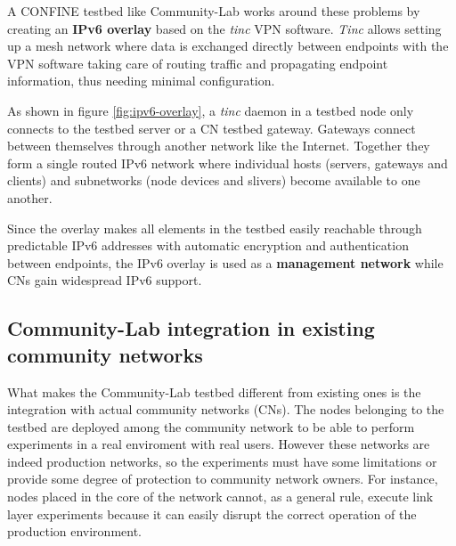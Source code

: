 \documentclass[conference]{IEEEtran}
\begin{document}
A CONFINE testbed like Community-Lab works around these problems by creating an \textbf{IPv6
  overlay} based on the \emph{tinc} \cite{tinc} VPN software.  \emph{Tinc}
allows setting up a mesh network where data is exchanged directly between
endpoints with the VPN software taking care of routing traffic and propagating
endpoint information, thus needing minimal configuration.

As shown in figure \ref{fig:ipv6-overlay}, a \emph{tinc} daemon in a testbed
node only connects to the testbed server or a CN testbed gateway.  Gateways
connect between themselves through another network like the Internet.
Together they form a single routed IPv6 network where individual hosts
(servers, gateways and clients) and subnetworks (node devices and slivers)
become available to one another.

Since the overlay makes all elements in the testbed easily reachable through
predictable IPv6 addresses with automatic encryption and authentication
between endpoints, the IPv6 overlay is used as a \textbf{management network}
while CNs gain widespread IPv6 support.






\subsection{Community-Lab integration in existing community networks}

What makes the Community-Lab testbed different from existing ones is the integration
with actual community networks (CNs). The nodes belonging to the testbed are deployed among the 
community network to be able to perform experiments in a real enviroment with real users. However 
these networks are indeed production networks, so the experiments must have some limitations or provide some
degree of protection to community network owners. For instance, nodes placed in the core of the network
cannot, as a general rule, execute link layer experiments because it can easily disrupt the correct
operation of the production environment.




\end{document}
